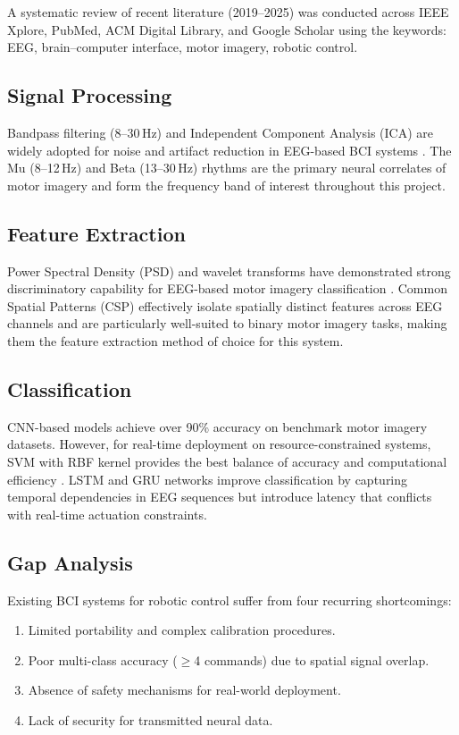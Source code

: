 \documentclass[12pt, a4paper, oneside]{report}
\begin{document}
A systematic review of recent literature (2019--2025) was conducted across IEEE Xplore,
PubMed, ACM Digital Library, and Google Scholar using the keywords: EEG,
brain--computer interface, motor imagery, robotic control.

\subsection{Signal Processing}

Bandpass filtering (8--30\,Hz) and Independent Component Analysis (ICA) are widely adopted
for noise and artifact reduction in EEG-based BCI systems \cite{mohamed2024}. The
Mu (8--12\,Hz) and Beta (13--30\,Hz) rhythms are the primary neural correlates of motor
imagery and form the frequency band of interest throughout this project.

\subsection{Feature Extraction}

Power Spectral Density (PSD) and wavelet transforms have demonstrated strong discriminatory
capability for EEG-based motor imagery classification \cite{elshahat2025}. Common Spatial
Patterns (CSP) effectively isolate spatially distinct features across EEG channels and are
particularly well-suited to binary motor imagery tasks, making them the feature extraction
method of choice for this system.

\subsection{Classification}

CNN-based models achieve over 90\% accuracy on benchmark motor imagery datasets.
However, for real-time deployment on resource-constrained systems, SVM with RBF kernel
provides the best balance of accuracy and computational efficiency \cite{cortes1995}.
LSTM and GRU networks improve classification by capturing temporal dependencies in EEG
sequences but introduce latency that conflicts with real-time actuation constraints.

\subsection{Gap Analysis}

Existing BCI systems for robotic control suffer from four recurring shortcomings:

\begin{enumerate}
    \item Limited portability and complex calibration procedures.
    \item Poor multi-class accuracy ($\geq$4 commands) due to spatial signal overlap.
    \item Absence of safety mechanisms for real-world deployment.
    \item Lack of security for transmitted neural data.
\end{enumerate}
\end{document}
